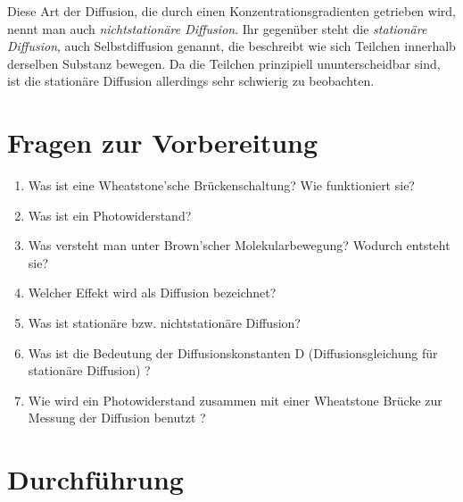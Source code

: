 Diese Art der Diffusion, die durch einen Konzentrationsgradienten getrieben wird, nennt man auch \textit{nichtstationäre Diffusion}. Ihr gegenüber steht die \textit{stationäre Diffusion}, auch Selbstdiffusion genannt, die beschreibt wie sich Teilchen innerhalb derselben Substanz bewegen. Da die Teilchen prinzipiell ununterscheidbar sind, ist die stationäre Diffusion allerdings sehr schwierig zu beobachten.
\section{Fragen zur Vorbereitung}

\begin{enumerate}
 \item Was ist eine Wheatstone'sche Brückenschaltung? Wie funktioniert sie?
 \item Was ist ein Photowiderstand?
 \item Was versteht man unter Brown'scher Molekularbewegung? Wodurch entsteht sie?
 \item Welcher Effekt wird als Diffusion bezeichnet?
 \item Was ist stationäre bzw. nichtstationäre Diffusion?
 \item Was ist die Bedeutung der Diffusionskonstanten D (Diffusionsgleichung für stationäre Diffusion) ?
 \item Wie wird ein Photowiderstand zusammen mit einer Wheatstone Brücke zur Messung der Diffusion benutzt ?
%
\end{enumerate}

\section{Durchführung} 

